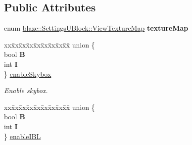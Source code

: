 \subsection*{Public Attributes}
\begin{DoxyCompactItemize}
\item 
\mbox{\label{structblaze_1_1SettingsUBlock_a29aa41ea92c2e3afca88f9d2510277ae}} 
enum \hyperlink{structblaze_1_1SettingsUBlock_aa79fb061eee4130840f5ba7a8b36fdff}{blaze\+::\+Settings\+U\+Block\+::\+View\+Texture\+Map} {\bfseries texture\+Map}
\item 
\mbox{\label{structblaze_1_1SettingsUBlock_ad760b30cf669a5c0a0c78bf7bd7e79f3}} 
\begin{tabbing}
xx\=xx\=xx\=xx\=xx\=xx\=xx\=xx\=xx\=\kill
union \{\\
\>bool {\bfseries B}\\
\>int {\bfseries I}\\
\} \hyperlink{structblaze_1_1SettingsUBlock_ad760b30cf669a5c0a0c78bf7bd7e79f3}{enableSkybox}\\

\end{tabbing}\begin{DoxyCompactList}\small\item\em Enable skybox. \end{DoxyCompactList}\item 
\mbox{\label{structblaze_1_1SettingsUBlock_a44eab5d7c0a7dfededada2937e045705}} 
\begin{tabbing}
xx\=xx\=xx\=xx\=xx\=xx\=xx\=xx\=xx\=\kill
union \{\\
\>bool {\bfseries B}\\
\>int {\bfseries I}\\
\} \hyperlink{structblaze_1_1SettingsUBlock_a44eab5d7c0a7dfededada2937e045705}{enableIBL}\\


\end{tabbing}
\end{DoxyCompactItemize}

